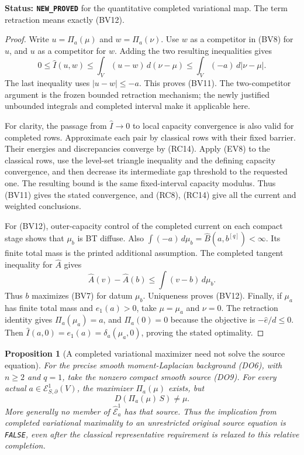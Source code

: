\documentclass[11pt,a4paper]{article}
\numberwithin{equation}{section}
\newtheorem{proposition}[theorem]{Proposition}
\theoremstyle{definition}
\theoremstyle{remark}
\begin{document}
\noindent\textbf{Status: \texttt{NEW\_PROVED}}
for the quantitative completed variational map.
The term retraction means exactly (BV12).

\begin{proof}
Write $u=\Pi_a(\mu)$ and $w=\Pi_a(\nu)$.
Use $w$ as a competitor in (BV8) for $u$,
and $u$ as a competitor for $w$.
Adding the two resulting inequalities gives
\[
 0\leq\widehat I(u,w)
       \leq\int_V(u-w)\,d(\nu-\mu)
       \leq\int_V(-a)\,d|\nu-\mu|.
\]
The last inequality uses $|u-w|\leq-a$.
This proves (BV11).  The two-competitor argument
is the frozen bounded retraction mechanism;
the newly justified unbounded integrals and
completed interval make it applicable here.

For clarity, the passage from $\widehat I\to0$
to local capacity convergence is also valid
for completed rows.  Approximate each pair
by classical rows with their fixed barrier.
Their energies and discrepancies converge
by (RC14).  Apply (EV8) to the classical
rows, use the level-set triangle inequality
and the defining capacity convergence, and
then decrease its intermediate gap threshold
to the requested one.  The resulting bound
is the same fixed-interval capacity modulus.
Thus (BV11) gives the stated convergence,
and (RC8), (RC14) give all the current
and weighted conclusions.

For (BV12), outer-capacity control of the
completed current on each compact stage
shows that $\mu_b$ is BT diffuse.
Also
$\int(-a)\,d\mu_b=\widehat B(a,b^{[q]})<\infty$.
Its finite total mass is the printed
additional assumption.
The completed tangent inequality for
$\widehat A$ gives
\[
 \widehat A(v)-\widehat A(b)
                    \leq\int(v-b)\,d\mu_b .
\]
Thus $b$ maximizes (BV7) for datum $\mu_b$.
Uniqueness proves (BV12).
Finally, if $\mu_a$ has finite total mass and
$e_1(a)>0$, take $\mu=\mu_a$ and $\nu=0$.
The retraction identity gives $\Pi_a(\mu_a)=a$,
and $\Pi_a(0)=0$ because the objective is
$-\widehat e/d\leq0$.
Then
$\widehat I(a,0)=e_1(a)=\delta_a(\mu_a,0)$,
proving the stated optimality.
\end{proof}

\begin{proposition}[A completed variational maximizer need not solve the source equation]
\label{prop:r11-completed-maximizer-source-obstruction}
For the precise smooth moment-Laplacian background
(DO6), with $n\geq2$ and $q=1$, take the
nonzero compact smooth source (DO9).
For every actual
$a\in\mathcal E^1_{S,\partial}(V)$, the
maximizer $\Pi_a(\mu)$ exists, but
\[
                            D(\Pi_a(\mu)\,S)\ne\mu .
 \tag{BV13}
\]
More generally no member of
$\widehat{\mathcal E}^1_a$ has that source.
Thus the implication from completed variational
maximality to an unrestricted original source
equation is \texttt{FALSE}, even after the
classical representative requirement is relaxed
to this relative completion.
\end{proposition}
\end{document}
